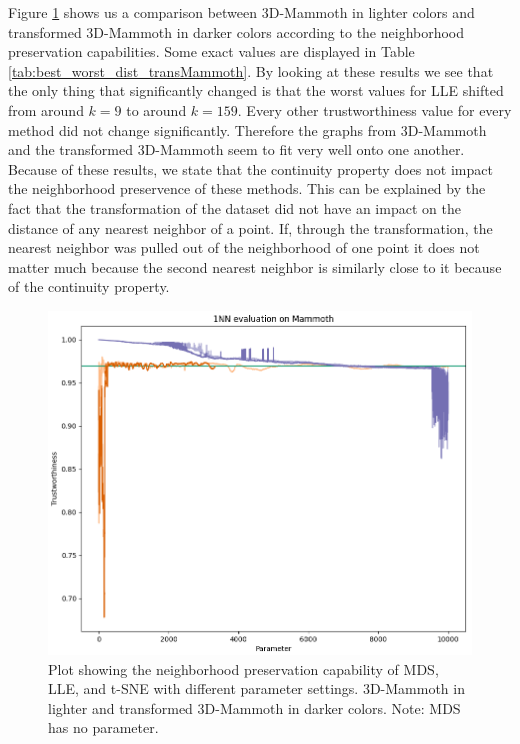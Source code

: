 Figure \ref{fig:1NN_transMammoth_all_B_and_A} shows us a comparison between 3D-Mammoth in lighter colors and transformed 3D-Mammoth in darker colors according to the neighborhood preservation capabilities. Some exact values are displayed in Table \ref{tab:best_worst_dist_transMammoth}. By looking at these results we see that the only thing that significantly changed is that the worst values for LLE shifted from around $k=9$ to around $k=159$. Every other trustworthiness value for every method did not change significantly. Therefore the graphs from 3D-Mammoth and the transformed 3D-Mammoth seem to fit very well onto one another. Because of these results, we state that the continuity property does not impact the neighborhood preservence of these methods. This can be explained by the fact that the transformation of the dataset did not have an impact on the distance of any nearest neighbor of a point. If, through the transformation, the nearest neighbor was pulled out of the neighborhood of one point it does not matter much because the second nearest neighbor is similarly close to it because of the continuity property.

\begin{figure}[!]
	\centering
	\includegraphics[width=1\columnwidth]{images/1NN_transMammoth_all_B_and_A.png}
	\caption[Transformed 3D-Mammoth Neighborhood Preservation]{Plot showing the neighborhood preservation capability of MDS, LLE, and t-SNE with different parameter settings. 3D-Mammoth in lighter and transformed 3D-Mammoth in darker colors. Note: MDS has no parameter.}
    \label{fig:1NN_transMammoth_all_B_and_A}
\end{figure}

